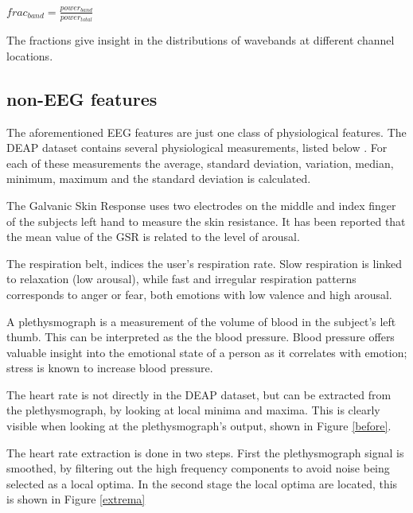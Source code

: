 \begin{center}
$frac_{band} = \frac{power_{band}}{power_{total}}$
\end{center}

The fractions give insight in the distributions of wavebands at different channel locations.

\subsection{non-EEG features}
The aforementioned EEG features are just one class of physiological features. The DEAP dataset contains several physiological measurements, listed below \citep{DEAP}. For each of these measurements the average, standard deviation, variation, median, minimum, maximum and the standard deviation is calculated.

\npar

The Galvanic Skin Response  uses two electrodes on the middle and index finger of the subjects left hand to measure the skin resistance. It has been reported that the mean value of the GSR is related to the level of arousal\citep{GSR, DEAP}.

\npar

The respiration belt, indices the user's respiration rate. Slow respiration is linked to relaxation (low arousal), while fast and irregular respiration patterns corresponds to anger or fear, both emotions with low valence and high arousal\citep{DEAP}.

\npar

A plethysmograph is a measurement of the volume of blood in the subject's left thumb. This can be interpreted as the the blood pressure. Blood pressure offers valuable insight into the emotional state of a person as it correlates with emotion; stress is known to increase blood pressure\citep{DEAP}.

\npar

The heart rate is not directly in the DEAP dataset, but can be extracted from the plethysmograph, by looking at local minima and maxima\citep{DEAP}. This is clearly visible when looking at the plethysmograph's output, shown in Figure \ref{before}.


The heart rate extraction is done in two steps. First the plethysmograph signal is smoothed, by filtering out the high frequency components to avoid noise being selected as a local optima. In the second stage the local optima are located, this is shown in Figure \ref{extrema}

